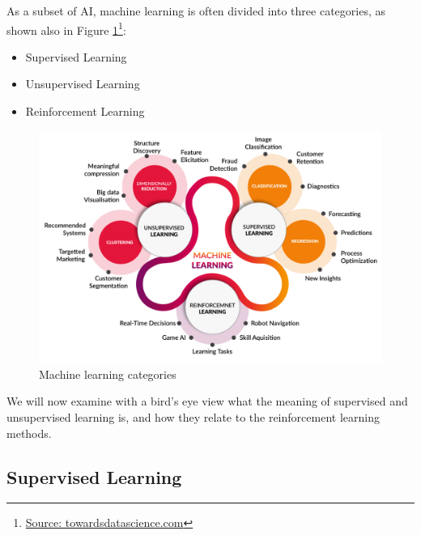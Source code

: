 As a subset of AI, machine learning is often divided into three categories, as shown also in Figure \ref{fig:mlcategories}\footnote{\href{https://towardsdatascience.com/coding-deep-learning-for-beginners-types-of-machine-learning-b9e651e1ed9d}{Source: towardsdatascience.com}}:
\begin{itemize}
	\item Supervised Learning
	\item Unsupervised Learning
	\item Reinforcement Learning
	\\
\end{itemize}

\begin{figure}[h!]
	\includegraphics[width=\columnwidth]{images/MachineLearningTypes.png}
	\caption{Machine learning categories}
	\label{fig:mlcategories}
\end{figure}

We will now examine with a bird's eye view what the meaning of supervised and unsupervised learning is, and how they relate to the reinforcement learning methods.  

\subsection{Supervised Learning}

